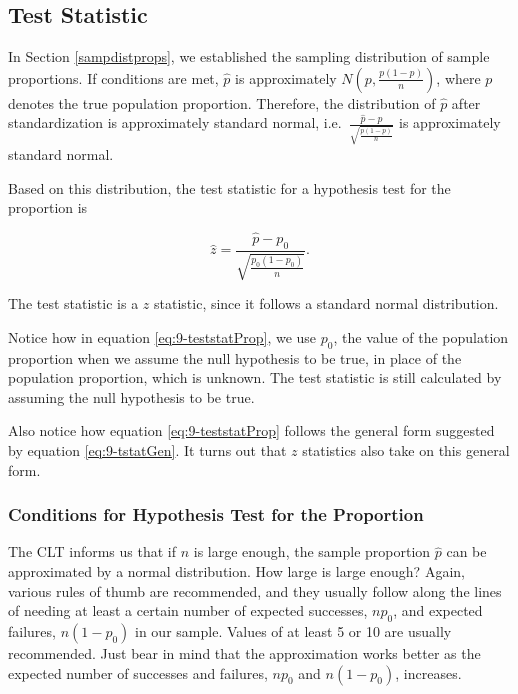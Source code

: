 \documentclass[
]{book}
\begin{document}
\hypertarget{test-statistic-1}{%
\subsection{Test Statistic}\label{test-statistic-1}}

In Section \ref{sampdistprops}, we established the sampling distribution of sample proportions. If conditions are met, \(\hat{p}\) is approximately \(N\left(p, \frac{p(1-p)}{n}\right)\), where \(p\) denotes the true population proportion. Therefore, the distribution of \(\hat{p}\) after standardization is approximately standard normal, i.e.~\(\frac{\hat{p}-p}{\sqrt{\frac{p(1-p)}{n}}}\) is approximately standard normal.

Based on this distribution, the test statistic for a hypothesis test for the proportion is

\begin{equation} 
\hat{z} =  \frac{\hat{p} - p_0}{\sqrt{\frac{p_0(1-p_0)}{n}}} .
\label{eq:9-teststatProp}
\end{equation}

The test statistic is a \(z\) statistic, since it follows a standard normal distribution.

Notice how in equation \eqref{eq:9-teststatProp}, we use \(p_0\), the value of the population proportion when we assume the null hypothesis to be true, in place of the population proportion, which is unknown. The test statistic is still calculated by assuming the null hypothesis to be true.

Also notice how equation \eqref{eq:9-teststatProp} follows the general form suggested by equation \eqref{eq:9-tstatGen}. It turns out that \(z\) statistics also take on this general form.

\hypertarget{conditions-for-hypothesis-test-for-the-proportion}{%
\subsubsection{Conditions for Hypothesis Test for the Proportion}\label{conditions-for-hypothesis-test-for-the-proportion}}

The CLT informs us that if \(n\) is large enough, the sample proportion \(\hat{p}\) can be approximated by a normal distribution. How large is large enough? Again, various rules of thumb are recommended, and they usually follow along the lines of needing at least a certain number of expected successes, \(n p_0\), and expected failures, \(n(1-p_0)\) in our sample. Values of at least 5 or 10 are usually recommended. Just bear in mind that the approximation works better as the expected number of successes and failures, \(np_0\) and \(n(1-p_0)\), increases.
\end{document}
